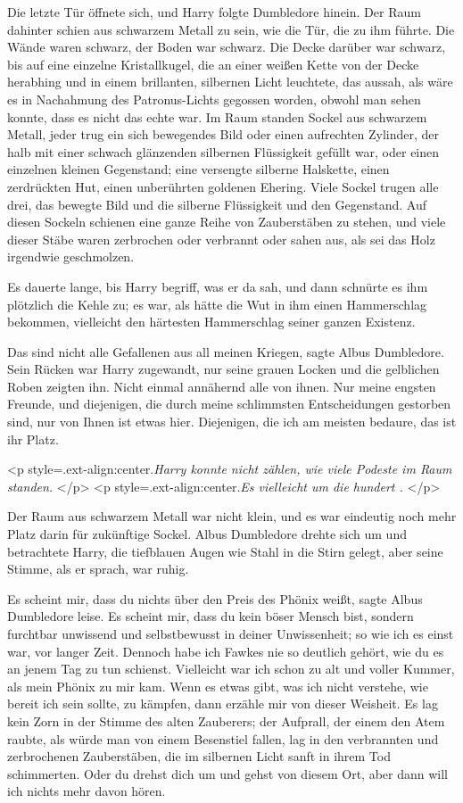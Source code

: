 Die letzte Tür öffnete sich, und Harry folgte Dumbledore hinein. Der Raum
dahinter schien aus schwarzem Metall zu sein, wie die Tür, die zu ihm führte.
Die Wände waren schwarz, der Boden war schwarz. Die Decke darüber war schwarz,
bis auf eine einzelne Kristallkugel, die an einer weißen Kette von der Decke
herabhing und in einem brillanten, silbernen Licht leuchtete, das aussah, als
wäre es in Nachahmung des Patronus-Lichts gegossen worden, obwohl man sehen
konnte, dass es nicht das echte war. Im Raum standen Sockel aus schwarzem
Metall, jeder trug ein sich bewegendes Bild oder einen aufrechten Zylinder, der
halb mit einer schwach glänzenden silbernen Flüssigkeit gefüllt war, oder einen
einzelnen kleinen Gegenstand; eine versengte silberne Halskette, einen
zerdrückten Hut, einen unberührten goldenen Ehering. Viele Sockel trugen alle
drei, das bewegte Bild und die silberne Flüssigkeit und den Gegenstand. Auf
diesen Sockeln schienen eine ganze Reihe von Zauberstäben zu stehen, und viele
dieser Stäbe waren zerbrochen oder verbrannt oder sahen aus, als sei das Holz
irgendwie geschmolzen.

Es dauerte lange, bis Harry begriff, was er da sah, und dann schnürte es ihm
plötzlich die Kehle zu; es war, als hätte die Wut in ihm einen Hammerschlag
bekommen, vielleicht den härtesten Hammerschlag seiner ganzen Existenz.

\glqq Das sind nicht alle Gefallenen aus all meinen Kriegen\grqq{}, sagte Albus
Dumbledore. Sein Rücken war Harry zugewandt, nur seine grauen Locken und die
gelblichen Roben zeigten ihn. \glqq Nicht einmal annähernd alle von ihnen. Nur
meine engsten Freunde, und diejenigen, die durch meine schlimmsten
Entscheidungen gestorben sind, nur von Ihnen ist etwas hier. Diejenigen, die ich
am meisten bedaure, das ist ihr Platz.\grqq{}

<p style=\grqq{}.ext-align:center\grqq{}.\emph{Harry konnte nicht zählen, wie
viele Podeste im Raum standen. }</p> <p
style=\grqq{}.ext-align:center\grqq{}.\emph{Es vielleicht um die hundert . }</p>

Der Raum aus schwarzem Metall war nicht klein, und es war eindeutig noch mehr
Platz darin für zukünftige Sockel. Albus Dumbledore drehte sich um und
betrachtete Harry, die tiefblauen Augen wie Stahl in die Stirn gelegt, aber
seine Stimme, als er sprach, war ruhig.

\glqq Es scheint mir, dass du nichts über den Preis des Phönix weißt\grqq{},
sagte Albus Dumbledore leise. \glqq Es scheint mir, dass du kein böser Mensch
bist, sondern furchtbar unwissend und selbstbewusst in deiner Unwissenheit; so
wie ich es einst war, vor langer Zeit. Dennoch habe ich Fawkes nie so deutlich
gehört, wie du es an jenem Tag zu tun schienst. Vielleicht war ich schon zu alt
und voller Kummer, als mein Phönix zu mir kam. Wenn es etwas gibt, was ich nicht
verstehe, wie bereit ich sein sollte, zu kämpfen, dann erzähle mir von dieser
Weisheit.\grqq{} Es lag kein Zorn in der Stimme des alten Zauberers; der
Aufprall, der einem den Atem raubte, als würde man von einem Besenstiel fallen,
lag in den verbrannten und zerbrochenen Zauberstäben, die im silbernen Licht
sanft in ihrem Tod schimmerten. \glqq Oder du drehst dich um und gehst von
diesem Ort, aber dann will ich nichts mehr davon hören.\grqq{}

